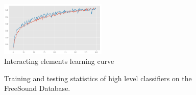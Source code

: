 \begin{figure}
    \centering
    \includegraphics[width=0.45\textwidth]{figures/interact-learning-curve.png}
    \caption{Interacting elements learning curve}
    \label{fig:my-label}
\end{figure}

\begin{figure}
    \centering
    \hfill
    \caption{Training and testing statistics of high level classifiers on the FreeSound Database.}
\end{figure}

